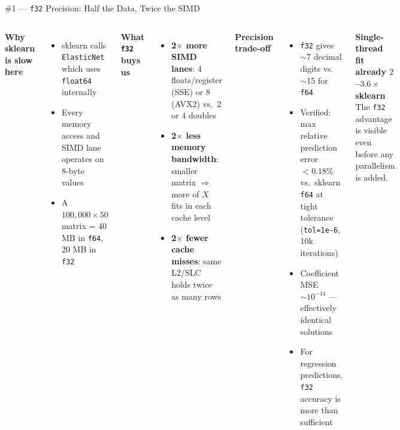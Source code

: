 \documentclass[aspectratio=169]{beamer}
\begin{document}
\begin{frame}[fragile]{\#1 — \texttt{f32} Precision: Half the Data, Twice the SIMD}
  \begin{columns}[T]
    \textbf{Why sklearn is slow here}
    \begin{itemize}
      \item sklearn calls \texttt{ElasticNet} which uses \texttt{float64} internally
      \item Every memory access and SIMD lane operates on 8-byte values
      \item A $100{,}000 \times 50$ matrix = 40 MB in \texttt{f64}, 20 MB in \texttt{f32}
    \end{itemize}
    \vspace{0.5em}
    \textbf{What \texttt{f32} buys us}
    \begin{itemize}
      \item \textbf{2$\times$ more SIMD lanes}: 4 floats/register (SSE) or 8 (AVX2)
            vs.\ 2 or 4 doubles
      \item \textbf{2$\times$ less memory bandwidth}: smaller matrix $\Rightarrow$
            more of $X$ fits in each cache level
      \item \textbf{2$\times$ fewer cache misses}: same L2/SLC holds twice as many rows
    \end{itemize}

    \textbf{Precision trade-off}
    \begin{itemize}
      \item \texttt{f32} gives $\sim$7 decimal digits vs.\ $\sim$15 for \texttt{f64}
      \item Verified: max relative prediction error $< 0.18\%$ vs.\ sklearn \texttt{f64}
            at tight tolerance (\texttt{tol=1e-6}, 10k iterations)
      \item Coefficient MSE $\sim 10^{-14}$ — effectively identical solutions
      \item For regression predictions, \texttt{f32} accuracy is more than sufficient
    \end{itemize}

    \vspace{0.4em}
    \textbf{Single-thread fit already $2$--$3.6\times$ sklearn}\\
    The \texttt{f32} advantage is visible even before any parallelism is added.
  \end{columns}
\end{frame}
\end{document}
